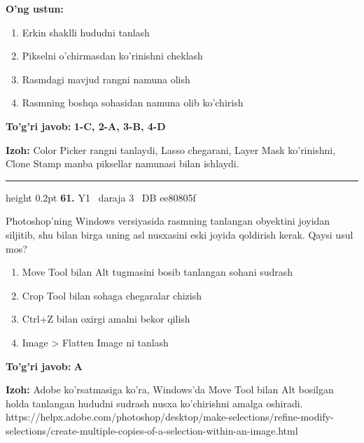 \documentclass[10pt,a4paper,oneside]{article}
\begin{document}
\textbf{\footnotesize O'ng ustun:}
\begin{enumerate}[label=\Alph*),leftmargin=9mm]
\item Erkin shaklli hududni tanlash
\item Pikselni o'chirmasdan ko'rinishni cheklash
\item Rasmdagi mavjud rangni namuna olish
\item Rasmning boshqa sohasidan namuna olib ko'chirish
\end{enumerate}
\begin{tcolorbox}[enhanced,breakable,colback=teal!4,colframe=teal!45!black,boxrule=0.45pt,arc=1.2mm,left=2.8mm,right=2.8mm,top=2mm,bottom=2mm,before skip=2mm,after skip=2mm]
\textbf{\color{teal}To'g'ri javob:} \textbf{1-C, 2-A, 3-B, 4-D}
\par\smallskip
\textbf{Izoh:} Color Picker rangni tanlaydi, Lasso chegarani, Layer Mask ko'rinishni, Clone Stamp manba piksellar namunasi bilan ishlaydi.
\end{tcolorbox}
\vspace{2mm}\hrule height 0.2pt \vspace{4mm}
\hypertarget{q61}{\textbf{\color{ink}61.}}  {\color{muted}\scriptsize Y1 \textbullet\ daraja 3 \textbullet\ DB ee80805f}
\par
Photoshop'ning Windows versiyasida rasmning tanlangan obyektini joyidan siljitib, shu bilan birga uning asl nusxasini eski joyida qoldirish kerak. Qaysi usul mos?
\begin{enumerate}[label=\Alph*),leftmargin=9mm]
\item Move Tool bilan Alt tugmasini bosib tanlangan sohani sudrash
\item Crop Tool bilan sohaga chegaralar chizish
\item Ctrl+Z bilan oxirgi amalni bekor qilish
\item Image \textgreater{} Flatten Image ni tanlash
\end{enumerate}
\begin{tcolorbox}[enhanced,breakable,colback=teal!4,colframe=teal!45!black,boxrule=0.45pt,arc=1.2mm,left=2.8mm,right=2.8mm,top=2mm,bottom=2mm,before skip=2mm,after skip=2mm]
\textbf{\color{teal}To'g'ri javob:} \textbf{A}
\par\smallskip
\textbf{Izoh:} Adobe ko'rsatmasiga ko'ra, Windows'da Move Tool bilan Alt bosilgan holda tanlangan hududni sudrash nusxa ko'chirishni amalga oshiradi. https://helpx.adobe.com/photoshop/desktop/make-selections/refine-modify-selections/create-multiple-copies-of-a-selection-within-an-image.html
\end{tcolorbox}
\end{document}
